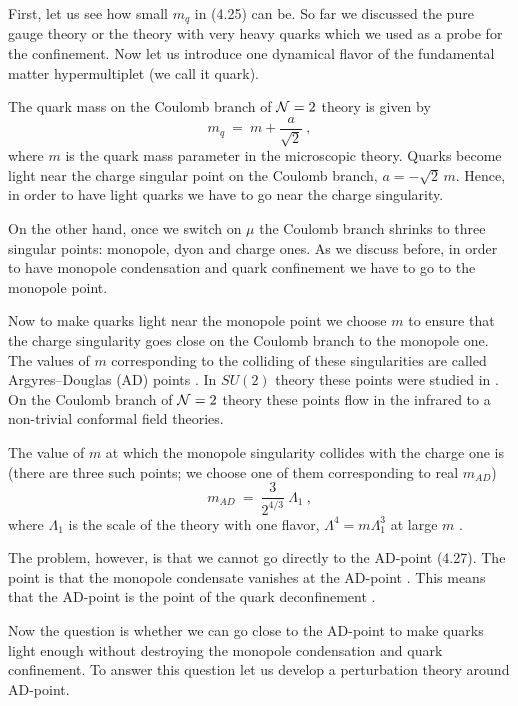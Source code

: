 \documentclass[a4paper,12pt]{article}
\begin{document}
First, let us see how small $m_q$ in (4.25) can be. So far
we  discussed the pure gauge theory or the theory with very
heavy quarks which we used as a probe for the confinement. Now
let us introduce one dynamical flavor  of the
fundamental matter hypermultiplet
\cite{SW2}(we call it quark).

The quark mass on the Coulomb branch of ${\cal N}=2$ theory is given by
\begin{equation}
m_q\ =\ m+\frac a{\sqrt2}\ ,
\end{equation}
where $m$ is the quark mass parameter in the microscopic theory.
Quarks become light near the charge singular point on the
Coulomb branch, $a=-\sqrt2\,m$. Hence, in order to have light
quarks we have to go near the charge singularity.

On the other hand, once we switch on $\mu $ the Coulomb
branch shrinks to three singular points: monopole, dyon and
charge ones. As we discuss before, in order to have monopole
condensation and quark confinement we have to go to the monopole
point.

Now to make quarks light near the monopole point we  choose  $m$
to ensure that the charge singularity goes close on the Coulomb
branch to the monopole one. The values of $m$ corresponding to
the colliding of these singularities are called Argyres--Douglas
(AD) points \cite{AD}. In $SU(2)$ theory these points were
studied in \cite{APSW}. On the Coulomb branch of ${\cal N}=2$ theory
these points flow in the infrared to a non-trivial conformal field
theories.

The value of $m$ at which the monopole singularity collides with the
charge one is \cite{APSW} (there are three such points; we choose
one of them corresponding to real $m_{AD}$)
\begin{equation}
m_{AD}\ =\ \frac3{2^{4/3}}\ \Lambda_1\ ,
\end{equation}
where $\Lambda_1$ is the scale of the theory with one flavor,
$\Lambda^4=m\Lambda^3_1$ at large $m$ .

The problem, however, is that we cannot go directly to the
AD-point (4.27). The point is that the monopole condensate
vanishes at the AD-point \cite{GVY}. This means that the
AD-point is the point of the quark deconfinement \cite{GVY}.

Now the question is whether we can go close to the AD-point to
make quarks light enough without destroying the monopole
condensation and quark confinement. To answer this question let
us develop a perturbation theory around AD-point.
\end{document}
